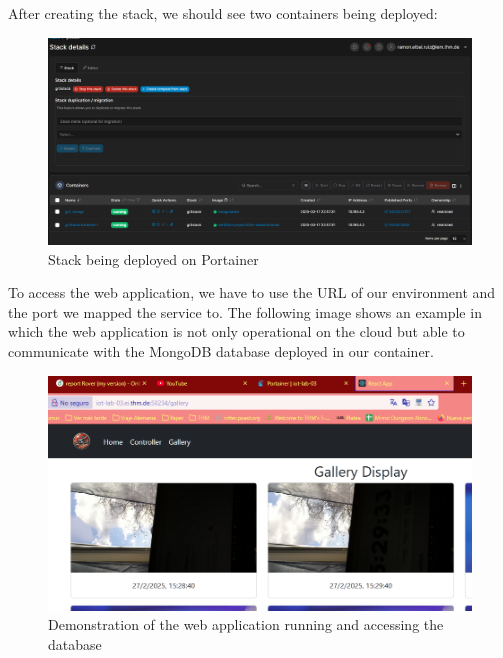 After creating the stack, we should see two containers being deployed:
\begin{figure}[H]
    \centering
    \includegraphics[width=0.5\linewidth]{Hauptkapitel/Pictures/stack.png}
    \caption{Stack being deployed on Portainer}
    \label{fig:enter-label}
\end{figure}

To access the web application, we have to use the URL of our environment and the port we mapped the service to. The following image shows an example in which the web application is not only operational on the cloud but able to communicate with the MongoDB database deployed in our container.
\begin{figure}[H]
    \centering
    \includegraphics[width=0.5\linewidth]{Hauptkapitel/Pictures/clouddemo.png}
    \caption{Demonstration of the web application running and accessing the database}
    \label{fig:enter-label}
\end{figure}